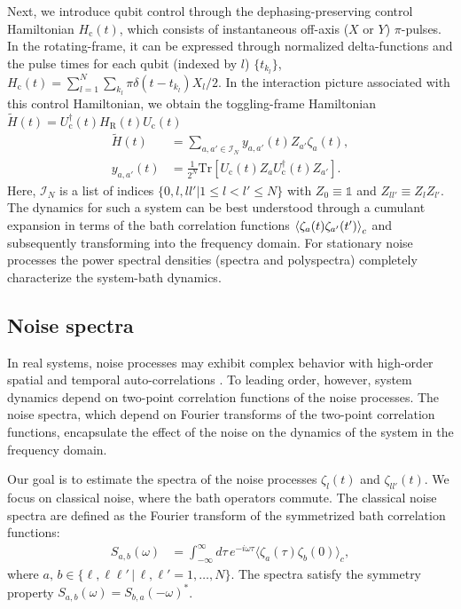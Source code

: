 \documentclass[%
 reprint,
superscriptaddress,
 amsmath,amssymb,
 aps,
pra,
floatfix,
]{revtex4-2}
\begin{document}
Next, we introduce qubit control through the dephasing-preserving control Hamiltonian $H_\text{c}(t)$, which consists of instantaneous off-axis ($X$ or $Y$) $\pi$-pulses. In the rotating-frame, it can be expressed through normalized delta-functions and the pulse times for each qubit (indexed by $l$) $\{t_{k_l}\}$, $H_\text{c}(t)=\sum_{l=1}^N\sum_{k_l} \pi\delta(t-t_{k_l})X_l/2$. In the interaction picture associated with this control Hamiltonian, we obtain the toggling-frame Hamiltonian $\tilde{H}(t)=U_\text{c}^\dagger(t)H_\text{R}(t)U_\text{c}(t)$
\begin{align}
    \tilde{H}(t)&=\sum_{a,a'\in \mathcal{I}_N}y_{a,a'}(t)Z_{a'}\zeta_{a}(t) ,\\
    y_{a,a'}(t)&=\frac{1}{2^N}\text{Tr}\left[U_\text{c}(t)Z_a U_\text{c}^\dagger(t)Z_{a'}\right].
\end{align}
Here, $\mathcal{I}_N$ is a list of indices $\{0, l, ll'|1\leq l<l'\leq N\}$ with $Z_0\equiv\mathbb{1}$ and $Z_{ll'}\equiv Z_{l}Z_{l'}$. 
The dynamics for such a system can be best understood through a cumulant expansion in terms of the bath correlation functions $\braket{\zeta_{a}(t)\zeta_{a'}(t')}_c$ and subsequently transforming into the frequency domain. For stationary noise processes the power spectral densities (spectra and polyspectra) completely characterize the system-bath dynamics.

\subsection{Noise spectra}
In real systems, noise processes may exhibit complex behavior with high-order spatial and temporal auto-correlations \cite{Ramon,Sung2019}. To leading order, however, system dynamics depend on two-point correlation functions of the noise processes. The noise spectra, which depend on Fourier transforms of the two-point correlation functions, encapsulate the effect of the noise on the dynamics of the system in the frequency domain.

Our goal is to estimate the spectra of the noise processes $\zeta_l(t)$ and $\zeta_{ll'}(t)$. We focus on classical noise, where the bath operators commute. The classical noise spectra are defined as the Fourier transform of the symmetrized bath correlation functions:
\begin{align}
    S_{a,b}(\omega) &= \int_{-\infty}^\infty d\tau\, e^{-i\omega\tau}\langle \zeta_a(\tau)\zeta_b(0)\rangle_{c},
\end{align}
where $a,\,b\in\{\ell,\ell\ell'\,|\,\ell,\ell'=1,\ldots,N\}$. The spectra satisfy the symmetry property $S_{a,b}(\omega) = S_{b,a}(-\omega)^*$.
\end{document}
